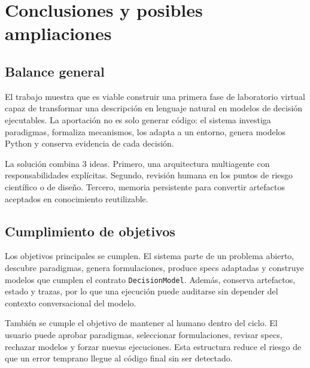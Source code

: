 \chapter{Conclusiones y posibles ampliaciones}

\section{Balance general}

El trabajo muestra que es viable construir una primera fase de laboratorio
virtual capaz de transformar una descripción en lenguaje natural en modelos de
decisión ejecutables. La aportación no es solo generar código: el sistema
investiga paradigmas, formaliza mecanismos, los adapta a un entorno, genera
modelos Python y conserva evidencia de cada decisión.

La solución combina 3 ideas. Primero, una arquitectura multiagente con
responsabilidades explícitas. Segundo, revisión humana en los puntos de riesgo
científico o de diseño. Tercero, memoria persistente para convertir artefactos
aceptados en conocimiento reutilizable.

\section{Cumplimiento de objetivos}

Los objetivos principales se cumplen. El sistema parte de un problema abierto,
descubre paradigmas, genera formulaciones, produce specs adaptadas y construye
modelos que cumplen el contrato \texttt{DecisionModel}. Además, conserva
artefactos, estado y trazas, por lo que una ejecución puede auditarse sin
depender del contexto conversacional del modelo.

También se cumple el objetivo de mantener al humano dentro del ciclo. El
usuario puede aprobar paradigmas, seleccionar formulaciones, revisar specs,
rechazar modelos y forzar nuevas ejecuciones. Esta estructura reduce el riesgo
de que un error temprano llegue al código final sin ser detectado.

